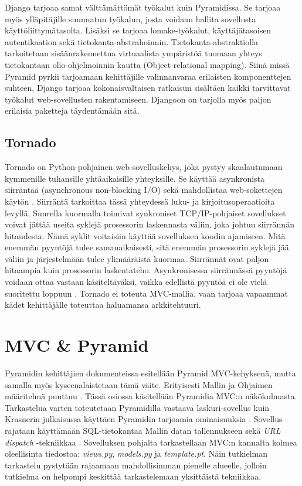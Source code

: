 \documentclass[utf8]{gradu3}
\begin{document}
Django tarjoaa samat välttämättömät työkalut kuin Pyramidissa. Se tarjoaa myös ylläpitäjille suunnatun työkalun, josta voidaan hallita sovellusta käyttöliittymätasolta. Lisäksi se tarjoaa lomake-työkalut, käyttäjätasoisen autentikaation sekä tietokanta-abstrahoinnin. Tietokanta-abstraktiolla tarkoitetaan sisäänrakennettua virtuaalista ympäristöä tuomaan yhteys tietokantaan olio-ohjelmoinnin kautta (Object-relational mapping)\parencite{djangobook}. Siinä missä Pyramid pyrkii tarjoamaan kehittäjille valinnanvaraa erilaisten komponenttejen suhteen, Django tarjoaa kokonaisvaltaisen ratkaisun sisältäen kaikki tarvittavat työkalut web-sovellusten rakentamiseen. Djangoon on tarjolla myös paljon erilaisia paketteja täydentämään sitä. 

\section{Tornado}
Tornado on Python-pohjainen web-sovelluskehys, joka pystyy skaalautumaan kymmenille tuhansille yhtäaikaisille yhteyksille. Se käyttää asynkronista siirräntää (asynchronous non-blocking I/O) sekä mahdollistaa web-sokettejen käytön \parencite{tornado}. Siirräntä tarkoittaa tässä yhteydessä luku- ja kirjoitusoperaatioita levyllä. Suurella kuormalla toimivat synkroniset TCP/IP-pohjaiset sovellukset voivat jättää useita syklejä prosessorin laskennasta väliin, joka johtuu siirrännän hitaudesta. Nämä syklit voitaisiin käyttää sovelluksen koodin ajamiseen. Mitä enemmän pyyntöjä tulee samanaikaisesti, sitä enemmän prosessorin syklejä jää väliin ja järjestelmään tulee ylimääräistä kuormaa. Siirrännät ovat paljon hitaampia kuin prosessorin laskentateho. Asynkronisessa siirrännässä pyyntöjä voidaan ottaa vastaan käsiteltäväksi, vaikka edellistä pyyntöä ei ole vielä suoritettu loppuun \parencite[s. 1]{async}. Tornado ei toteuta MVC-mallia, vaan tarjoaa vapaammat kädet kehittäjälle toteuttaa haluamansa arkkitehtuuri. 

\chapter{MVC \& Pyramid}
Pyramidin kehittäjien dokumenteissa esitellään Pyramid MVC-kehyksenä, mutta samalla myös kyseenalaistetaan tämä väite. Erityisesti Mallin ja Ohjaimen määritelmä puuttuu \parencite{pyramid_intr}. Tässä
osiossa käsitellään Pyramidia MVC:n näkökulmasta. Tarkastelua varten toteutetaan Pyramidilla vastaava laskuri-sovellus kuin Krasnerin julkaisussa käyttäen Pyramidin tarjoamia ominaisuuksia \parencite{krasner_desc}. Sovellus rajataan käyttämään SQL-tietokantaa Mallin datan tallennukseen sekä \emph{URL dispatch} -tekniikkaa \parencite{urldispatch}. Sovelluksen pohjalta tarkastellaan MVC:n kannalta kolmea oleellisinta tiedostoa: \emph{views.py}, \emph{models.py} ja \emph{template.pt}. Näin tutkielman tarkastelu pystytään rajaamaan mahdollisimman pienelle alueelle, jolloin tutkielma on helpompi keskittää tarkastelemaan yksittäistä tekniikkaa.
\end{document}
